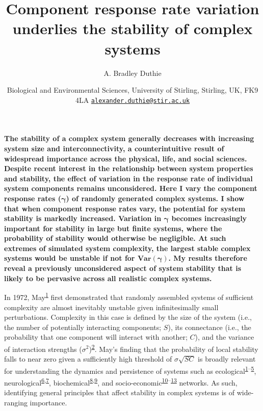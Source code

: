 \documentclass[]{article}
\title{Component response rate variation underlies the stability of complex systems}
\author{A. Bradley Duthie}
\date{Biological and Environmental Sciences, University of Stirling, Stirling,
UK, FK9 4LA
\href{mailto:alexander.duthie@stir.ac.uk}{\nolinkurl{alexander.duthie@stir.ac.uk}}}
\begin{document}
\maketitle

\textbf{The stability of a complex system generally decreases with increasing
system size and interconnectivity, a counterintuitive result of
widespread importance across the physical, life, and social sciences.
Despite recent interest in the relationship between system properties
and stability, the effect of variation in the response rate of
individual system components remains unconsidered. Here I vary the
component response rates (\(\boldsymbol{\gamma}\)) of randomly generated
complex systems. I show that when component response rates vary, the
potential for system stability is markedly increased. Variation in
\(\boldsymbol{\gamma}\) becomes increasingly important for stability in
large but finite systems, where the probability of stability would
otherwise be negligible. At such extremes of simulated system
complexity, the largest stable complex systems would be unstable if not
for \(\boldsymbol{Var(\gamma)}\). My results therefore reveal a
previously unconsidered aspect of system stability that is likely to be
pervasive across all realistic complex systems.}

In 1972, May\textsuperscript{\protect\hyperlink{ref-May1972}{1}} first
demonstrated that randomly assembled systems of sufficient complexity
are almost inevitably unstable given infinitesimally small
perturbations. Complexity in this case is defined by the size of the
system (i.e., the number of potentially interacting components; \(S\)),
its connectance (i.e., the probability that one component will interact
with another; \(C\)), and the variance of interaction strengths
(\(\sigma^{2}\))\textsuperscript{\protect\hyperlink{ref-Allesina2012}{2}}.
May's finding that the probability of local stability falls to near zero
given a sufficiently high threshold of \(\sigma\sqrt{SC}\) is broadly
relevant for understanding the dynamics and persistence of systems such
as
ecological\textsuperscript{\protect\hyperlink{ref-May1972}{1}--\protect\hyperlink{ref-Grilli2017}{5}},
neurological\textsuperscript{\protect\hyperlink{ref-Gray2008}{6},\protect\hyperlink{ref-Gray2009}{7}},
biochemical\textsuperscript{\protect\hyperlink{ref-Rosenfeld2009}{8},\protect\hyperlink{ref-MacArthur2010}{9}},
and
socio-economic\textsuperscript{\protect\hyperlink{ref-May2008}{10}--\protect\hyperlink{ref-Bardoscia2017}{13}}
networks. As such, identifying general principles that affect stability
in complex systems is of wide-ranging importance.
\end{document}
